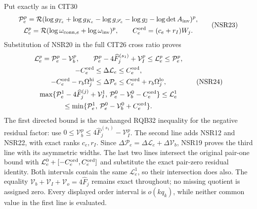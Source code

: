 \documentclass[11pt,a4paper]{article}
\begin{document}
Put exactly as in CIT30
\[
 \begin{gathered}
 \mathcal P_e^p
  =\mathcal R(\log g_{T_e}+\log g_{K_e}-\log g_{\mathscr S_e}
                   -\log g_{\mathbb J}-\log\det A_{\rm inv})^p,\\
 \mathcal L_e^p
   =\mathcal R(\log\omega_{{\rm conn},e}
                         +\log\omega_{\rm inv})^p,\qquad
 C_e^{\rm ord}=(c_e+r_I)W_j .
 \end{gathered}\tag{NSR23}
\]
Substitution of NSR20 in the full CIT26 cross ratio proves
\[
 \begin{gathered}
 \mathcal L_e^p=\mathcal P_e^p-\mathcal V_b^p,\qquad
 \mathcal P_e^p-4\widehat F_j^{(s_1)}+\mathcal V_I^p
           \le\mathcal L_e^p\le\mathcal P_e^p,\\
 -C_e^{\rm ord}\le\Delta\mathcal L_e\le C_e^{\rm ord},\\
 -C_e^{\rm ord}-r_b\Omega_j^{\rm hi}
       \le\Delta\mathcal P_e
       \le C_e^{\rm ord}+r_b\Omega_j^{\rm lo},\\
 \max\{\mathcal P_e^1-4\widehat F_j^{(j)}+\mathcal V_I^1,\,
          \mathcal P_e^0-\mathcal V_b^0-C_e^{\rm ord}\}
 \le\mathcal L_e^1\\
 \le\min\{\mathcal P_e^1,\,
          \mathcal P_e^0-\mathcal V_b^0+C_e^{\rm ord}\}.
 \end{gathered}\tag{NSR24}
\]
The first directed bound is the unchanged RQB32 inequality
for the negative residual factor: use
$0\le\mathcal V_b^p\le4\widehat F_j^{(s_1)}-\mathcal V_I^p$.
The second line adds NSR12 and NSR22, with exact ranks
$c_e,r_I$. Since $\Delta\mathcal P_e=
\Delta\mathcal L_e+\Delta\mathcal V_b$, NSR19 proves the
third line with its asymmetric widths. The last two lines
intersect the original pair-one bound with
$\mathcal L_e^0+[-C_e^{\rm ord},C_e^{\rm ord}]$ and substitute
the exact pair-zero residual identity. Both intervals
contain the same $\mathcal L_e^1$, so their intersection
does also. The equality
$\mathcal V_b+\mathcal V_I+\mathcal V_o=4\widehat F_j$
remains exact throughout; no missing quotient is assigned
zero. Every displayed order interval is $o(kq_k)$,
while neither common value in the first line is evaluated.
\end{document}
